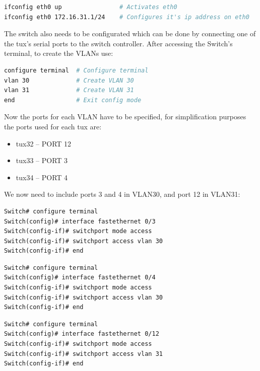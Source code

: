 \documentclass[a4paper,11pt,english]{article}
\begin{document}
\begin{lstlisting}[language=sh]
ifconfig eth0 up                # Activates eth0
ifconfig eth0 172.16.31.1/24    # Configures it's ip address on eth0
\end{lstlisting}

            The switch also needs to be configurated which can be done by connecting one of
            the tux's serial ports to the switch controller. After accessing the Switch's
            terminal, to create the VLANs use:

\begin{lstlisting}[language=sh]
configure terminal  # Configure terminal
vlan 30             # Create VLAN 30
vlan 31             # Create VLAN 31
end                 # Exit config mode
\end{lstlisting}

            Now the ports for each VLAN have to be specified, for simplification purposes
            the ports used for each tux are:

            \begin{itemize}
                \item tux32 -- PORT 12
                \item tux33 -- PORT 3
                \item tux34 -- PORT 4
            \end{itemize}

            We now need to include ports 3 and 4 in VLAN30, and port 12 in VLAN31:

\begin{lstlisting}[caption=Adding port 3 to VLAN30]
Switch# configure terminal
Switch(config)# interface fastethernet 0/3
Switch(config-if)# switchport mode access
Switch(config-if)# switchport access vlan 30
Switch(config-if)# end
\end{lstlisting}

\begin{lstlisting}[caption=Adding port 4 to VLAN30]
Switch# configure terminal
Switch(config)# interface fastethernet 0/4
Switch(config-if)# switchport mode access
Switch(config-if)# switchport access vlan 30
Switch(config-if)# end
\end{lstlisting}

\begin{lstlisting}[caption=Adding port 12 to VLAN31]
Switch# configure terminal
Switch(config)# interface fastethernet 0/12
Switch(config-if)# switchport mode access
Switch(config-if)# switchport access vlan 31
Switch(config-if)# end
\end{lstlisting}
\end{document}
